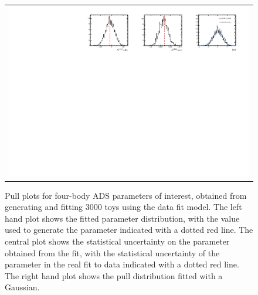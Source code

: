 \begin{figure}
\begin{tabular}{c}
\includegraphics[width=\textwidth]{ANA_resources/Plots/Data_fit/FitterBias//CombinedRuns//A_Bs_piKpipi.pdf} \\
  \end{tabular}
  \caption{Pull plots for four-body ADS parameters of interest, obtained from generating and fitting 3000 toys using the data fit model. The left hand plot shows the fitted parameter distribution, with the value used to generate the parameter indicated with a dotted red line. The central plot shows the statistical uncertainty on the parameter obtained from the fit, with the statistical uncertainty of the parameter in the real fit to data indicated with a dotted red line. The right hand plot shows the pull distribution fitted with a Gaussian.}
\label{fig:fourBody_ADS/CombinedRuns/_pulls}
\end{figure}
